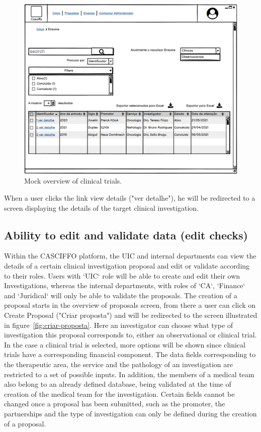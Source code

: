 \begin{figure}[H]
    \centering
    \includegraphics[scale=0.35]{images/ensaios.png}
    \caption{Mock overview of clinical trials.}
    \label{fig:ensaios}
\end{figure}


When a user clicks the link view details ("ver detalhe"), he will be redirected to a screen displaying the details of the target clinical investigation.

\subsection{Ability to edit and validate data (edit checks)}
\label{subsec:abilitiy-to-edit}
Within the CASCIFFO platform, the UIC and internal departments can view the details of a certain clinical investigation proposal and edit or validate according to their roles.
Users with `UIC` role will be able to create and edit their own Investigations, whereas the internal departments, with roles of `CA`, `Finance` and `Juridical` will only be able to validate the proposals.  
The creation of a proposal starts in the overview of proposals screen, from there a user can click on Create Proposal ("Criar proposta") and will be redirected to the screen illustrated in figure~\ref{fig:criar-proposta}. Here an investigator can choose what type of investigation this proposal corresponds to, either an observational or clinical trial. In the case a clinical trial is selected, more options will be shown since clinical trials have a corresponding financial component.
The data fields corresponding to the therapeutic area, the service and the pathology of an investigation are restricted to a set of possible inputs. In addition, the members of a medical team also belong to an already defined database, being validated at the time of creation of the medical team for the investigation.  
Certain fields cannot be changed once a proposal has been submitted, such as the promoter, the partnerships and the type of investigation can only be defined during the creation of a proposal.  


